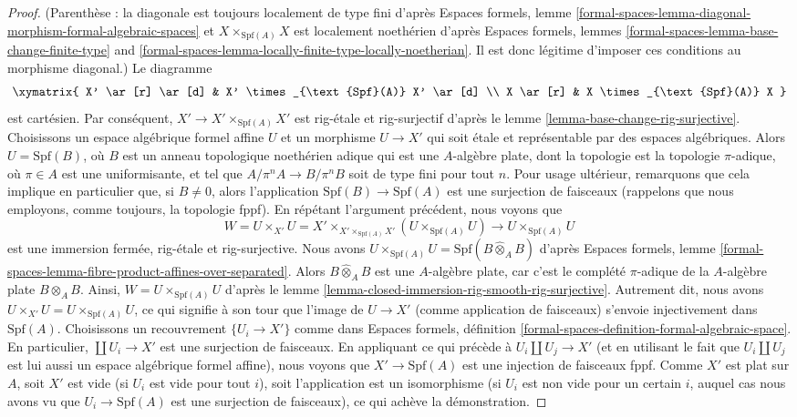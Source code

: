 \begin{proof}
(Parenthèse : la diagonale est toujours localement de type fini d'après
Espaces formels, lemme
\ref{formal-spaces-lemma-diagonal-morphism-formal-algebraic-spaces}
et $X \times_{\text{Spf}(A)} X$ est localement noethérien d'après
Espaces formels, lemmes
\ref{formal-spaces-lemma-base-change-finite-type} and
\ref{formal-spaces-lemma-locally-finite-type-locally-noetherian}.
Il est donc légitime d'imposer ces conditions au morphisme diagonal.)
Le diagramme
$$
\xymatrix{
X' \ar[r] \ar[d] & X' \times_{\text{Spf}(A)} X' \ar[d] \\
X \ar[r] & X \times_{\text{Spf}(A)} X
}
$$
est cartésien. Par conséquent, $X' \to X' \times_{\text{Spf}(A)} X'$
est rig-étale et rig-surjectif d'après le
lemme \ref{lemma-base-change-rig-surjective}.
Choisissons un espace algébrique formel affine $U$ et un morphisme
$U \to X'$ qui soit étale et représentable par des espaces algébriques.
Alors $U = \text{Spf}(B)$, où $B$ est un anneau topologique noethérien adique
qui est une $A$-algèbre plate, dont la topologie est la topologie
$\pi$-adique, où $\pi \in A$ est une uniformisante, et tel que
$A/\pi^n A \to B/\pi^n B$ soit de type fini pour tout $n$.
Pour usage ultérieur, remarquons que cela implique en particulier que, si
$B \not = 0$, alors l'application $\text{Spf}(B) \to \text{Spf}(A)$ est une
surjection de faisceaux (rappelons que nous employons, comme toujours,
la topologie fppf). En répétant l'argument précédent, nous voyons que
$$
W = U \times_{X'} U =
X' \times_{X' \times_{\text{Spf}(A)} X'} (U \times_{\text{Spf}(A)} U)
\longrightarrow
U \times_{\text{Spf}(A)} U
$$
est une immersion fermée, rig-étale et rig-surjective. Nous avons
$U \times_{\text{Spf}(A)} U = \text{Spf}(B \widehat{\otimes}_A B)$
d'après Espaces formels, lemme
\ref{formal-spaces-lemma-fibre-product-affines-over-separated}.
Alors $B \widehat{\otimes}_A B$ est une $A$-algèbre plate,
car c'est le complété $\pi$-adique de la $A$-algèbre plate $B \otimes_A B$.
Ainsi, $W = U \times_{\text{Spf}(A)} U$ d'après le
lemme \ref{lemma-closed-immersion-rig-smooth-rig-surjective}.
Autrement dit, nous avons $U \times_{X'} U = U \times_{\text{Spf}(A)} U$,
ce qui signifie à son tour que l'image de $U \to X'$ (comme application
de faisceaux) s'envoie injectivement dans $\text{Spf}(A)$.
Choisissons un recouvrement $\{U_i \to X'\}$ comme dans Espaces formels, définition
\ref{formal-spaces-definition-formal-algebraic-space}.
En particulier, $\coprod U_i \to X'$ est une surjection de faisceaux.
En appliquant ce qui précède à $U_i \coprod U_j \to X'$ (et en utilisant
le fait que $U_i \amalg U_j$ est lui aussi un espace algébrique formel
affine), nous voyons que $X' \to \text{Spf}(A)$ est une injection
de faisceaux fppf. Comme $X'$ est plat sur $A$, soit $X'$ est vide
(si $U_i$ est vide pour tout $i$), soit l'application est un isomorphisme
(si $U_i$ est non vide pour un certain $i$, auquel cas nous avons vu que
$U_i \to \text{Spf}(A)$ est une surjection de faisceaux),
ce qui achève la démonstration.
\end{proof}


